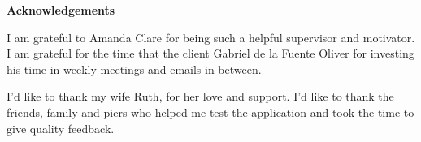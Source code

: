 \thispagestyle{empty}

\begin{center}
    {\LARGE\bf Acknowledgements}
\end{center}

I am grateful to Amanda Clare for being such a helpful supervisor and motivator. I am grateful for the time that the client Gabriel de la Fuente Oliver for investing his time in weekly meetings and emails in between.

I'd like to thank my wife Ruth, for her love and support. I'd like to thank the friends, family and piers who helped me test the application and took the time to give quality feedback.
